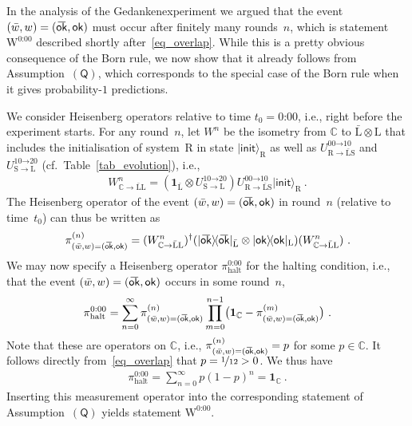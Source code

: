 \documentclass{article}
\theoremstyle{mystyle}
\theoremstyle{definition}
\newcommand{\oline}[2]{{\mkern#2mu\overline{\protect\vphantom{t}\mkern-#2mu\smash{#1}\mkern-#2mu}\mkern#2mu}}
\newcommand*{\id}{\mathbf{1}}
\newcommand*{\ket}[1]{{| #1 \rangle}}
\newcommand{\proj}[1]{|#1\rangle\!\langle #1|}
\newcommand*{\Labone}{\mathrm{\bar{L}}}
\newcommand*{\Labtwo}{\mathrm{L}}
\newcommand*{\Wigner}{\mathrm{W}}
\newcommand*{\Spin}{\mathrm{S}}
\newcommand*{\Coin}{\mathrm{R}}
\newcommand*{\wb}{\bar{w}}
\newcommand*{\QT}{\mathsf{(Q)}}
\newcommand*{\ok}{\mathsf{ok}}
\newcommand*{\okb}{\oline{\ok}{2.8}}
\begin{document}
In the analysis of the Gedankenexperiment we argued that  the event $(\wb,w) = (\okb, \ok)$ must occur after finitely many rounds~$n$, which is statement~$\Wigner^{\text{0:00}}$ described shortly after~\eqref{eq_overlap}.  While this is a pretty obvious consequence of the Born rule, we now show that it already follows from Assumption~$\QT$, which corresponds to the special case of the Born rule when it gives probability-$1$ predictions. 

We consider Heisenberg operators relative to time $t_0=\text{0:00}$, i.e., right before the experiment starts. For any round~$n$, let $W^n$ be the isometry from $\mathbb{C}$ to $\Labone \otimes \Labtwo$ that includes the  initialisation of system~$\Coin$ in state $\ket{\mathsf{init}}_{\Coin}$ as well as $U_{\Coin \to \Labone \Spin}^{\text{00} \to \text{10}}$ and $U_{\Spin \to \Labtwo}^{\text{10} \to \text{20}}$ (cf.\ Table~\ref{tab_evolution}), i.e., 
\begin{align}
  W_{\mathbb{C} \to \Labone \Labtwo}^n =(\id_{\Labone} \otimes U_{\Spin \to \Labtwo}^{\text{10} \to \text{20}}) U_{\Coin \to \Labone \Spin}^{\text{00} \to \text{10}} \ket{\mathsf{init}}_{\Coin} \ .
\end{align}
The Heisenberg operator of the event $(\wb,w) =(\okb, \ok)$ in round~$n$ (relative to time~$t_0$) can thus be written as 
\begin{align}
  \pi^{(n)}_{(\wb,w) = (\okb, \ok)} = (W_{\mathbb{C} \to \Labone \Labtwo}^n)^{\dagger} (\proj{\okb}_{\Labone} \otimes \proj{\ok}_{\Labtwo}) (W_{\mathbb{C} \to \Labone \Labtwo}^n)  \ .
\end{align}
We may now specify a Heisenberg operator $\pi^{\text{0:00}}_{\mathrm{halt}}$ for the halting condition, i.e., that the event $(\wb, w) = (\okb,\ok)$  occurs in some round~$n$, 
\begin{align}
  \pi^{\text{0:00}}_{\mathrm{halt}} = \sum_{n=0}^\infty \pi^{(n)}_{(\wb,w)=(\okb, \ok)} \prod_{m=0}^{n-1} \bigl(\id_{\mathbb{C}}-\pi^{(m)}_{(\wb,w)=(\okb, \ok)}  \bigr) \ .
\end{align}
Note that these are operators on $\mathbb{C}$, i.e.,  $\smash{\pi^{(n)}_{(\wb,w)=(\okb, \ok)}} = p$ for some $p \in \mathbb{C}$. It follows directly from~\eqref{eq_overlap} that $p = \nicefrac{1}{12} > 0$. We thus have
\begin{align}
  \pi^{\text{0:00}}_{\mathrm{halt}} 
  = \sum_{n=0}^\infty p (1-p)^{n} = \id_{\mathbb{C}} \ .
\end{align}
Inserting this measurement operator into the corresponding statement of   Assumption~$\QT$ yields statement $\Wigner^{\text{0:00}}$.
\end{document}
